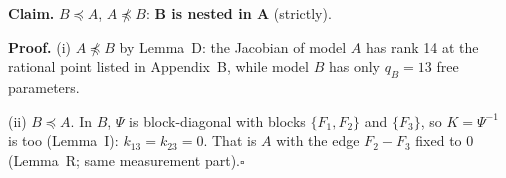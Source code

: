 \documentclass[10pt,a4paper]{article}
\newcommand{\nest}{\preceq}
\newcommand{\nnest}{\not\preceq}
\begin{document}
\noindent\textbf{Claim.} $B \nest A$, $A \nnest B$: \textbf{B is nested in A} (strictly).\par\smallskip
\noindent\textbf{Proof.} (i) $A\nnest B$ by Lemma~D: the Jacobian of model $A$ has rank 14 at the rational point listed in Appendix~B, while model $B$ has only $q_B=13$ free parameters.\par\smallskip
\noindent(ii) $B\nest A$. In $B$, $\Psi$ is block-diagonal with blocks $\{F_1,F_2\}$ and $\{F_3\}$, so $K=\Psi^{-1}$ is too (Lemma~I): $k_{13}=k_{23}=0$. That is $A$ with the edge $F_2-F_3$ fixed to 0 (Lemma~R; same measurement part).\hfill$\square$\par\medskip
{}

\clearpage
\end{document}
